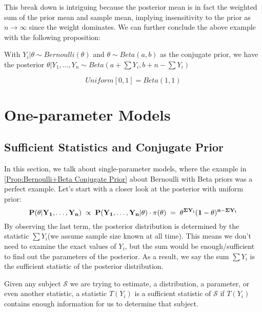 This break down is intriguing because the posterior mean is in fact the weighted sum of the prior mean and sample mean, implying insensitivity to the prior as $n\rightarrow \infty$ since the weight dominates. We can further conclude the above example with the following proposition:

\begin{proposition}\label{Prop:BernoulliBeta_Conjugate_Prior}
    With $Y_i|\theta \sim Bernoulli(\theta)$ and $\theta \sim Beta(a,b)$ as the conjugate prior, we have the posterior $\theta | Y_1, \ldots, Y_n \sim Beta(a + \sum Y_i, b + n - \sum Y_i)$
\end{proposition}

\begin{remark}
    \begin{equation*}
        Uniform[0,1] = Beta(1,1)
    \end{equation*}
\end{remark}

\section{One-parameter Models}

\subsection{Sufficient Statistics and Conjugate Prior}

In this section, we talk about single-parameter models, where the example in \autoref{Prop:Bernoulli+Beta Conjugate Prior} about Bernoulli with Beta priors was a perfect example. Let's start with a closer look at the posterior with uniform prior:
\begin{equation*}
    \bf{P}(\theta | Y_1, \ldots, Y_n) 
    \;\propto\; \bf{P}(Y_1, \ldots, Y_n | \theta) \cdot \pi(\theta) 
    \; = \; \theta^{\Sigma Y_i}(1-\theta)^{n - \Sigma Y_i}
\end{equation*}
By observing the last term, the posterior distribution is determined by the statistic $\sum Y_i$(we assume sample size known at all time). This means we don't need to examine the exact values of $Y_i$, but the sum would be enough/sufficient to find out the parameters of the posterior. As a result, we say the sum $\sum Y_i$ is the sufficient statistic of the posterior distribution.

\begin{definition}
    Given any subject $\mathcal{S}$ we are trying to estimate, a distribution, a parameter, or even another statistic, a statistic $T(Y_i)$ is a sufficient statistic of $\mathcal{S}$ if $T(Y_i)$ contains enough information for us to determine that subject.
\end{definition}

